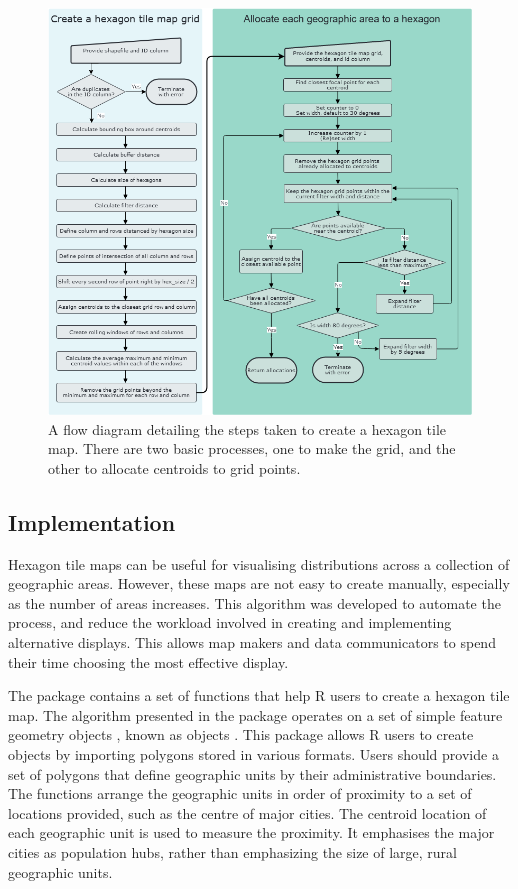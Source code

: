 \begin{Schunk}
\begin{figure}
\includegraphics[width=1\linewidth]{figs/sugarbag_flow} \caption[A flow diagram detailing the steps taken to create a hexagon tile map]{A flow diagram detailing the steps taken to create a hexagon tile map. There are two basic processes, one to make the grid, and the other to allocate centroids to grid points.}\label{fig:sugarbagflow}
\end{figure}
\end{Schunk}

\hypertarget{implementation}{%
\subsection{Implementation}\label{implementation}}

Hexagon tile maps can be useful for visualising distributions across a
collection of geographic areas. However, these maps are not easy to
create manually, especially as the number of areas increases. This
algorithm was developed to automate the process, and reduce the workload
involved in creating and implementing alternative displays. This allows
map makers and data communicators to spend their time choosing the most
effective display.

The  package contains a set of functions that help R users
to create a hexagon tile map. The algorithm presented in the
 package operates on a set of simple feature geometry
objects , known as  objects \citep{sf}. This package allows
R users to create  objects by importing polygons stored in
various formats. Users should provide a set of polygons that define
geographic units by their administrative boundaries. The functions
arrange the geographic units in order of proximity to a set of locations
provided, such as the centre of major cities. The centroid location of
each geographic unit is used to measure the proximity. It emphasises the
major cities as population hubs, rather than emphasizing the size of
large, rural geographic units.


